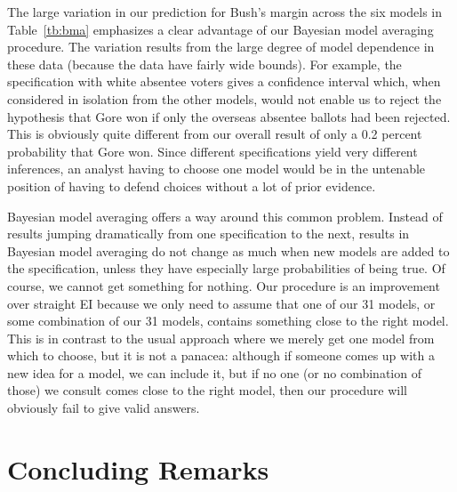 \documentclass[11pt,titlepage]{article}
\begin{document}
The large variation in our prediction for Bush's margin across the six
models in Table~\ref{tb:bma} emphasizes a clear advantage of our
Bayesian model averaging procedure.  The variation results from the
large degree of model dependence in these data (because the data have
fairly wide bounds).  For example, the specification with white
absentee voters gives a confidence interval which, when considered in
isolation from the other models, would not enable us to reject the
hypothesis that Gore won if only the overseas absentee ballots had
been rejected.  This is obviously quite different from our overall
result of only a 0.2 percent probability that Gore won.  Since
different specifications yield very different inferences, an analyst
having to choose one model would be in the untenable position of
having to defend choices without a lot of prior evidence.  

Bayesian model averaging offers a way around this common problem.
Instead of results jumping dramatically from one specification to the
next, results in Bayesian model averaging do not change as much when
new models are added to the specification, unless they have especially
large probabilities of being true.  Of course, we cannot get something
for nothing.  Our procedure is an improvement over straight EI because
we only need to assume that one of our 31 models, or some combination
of our 31 models, contains something close to the right model.  This
is in contrast to the usual approach where we merely get one model
from which to choose, but it is not a panacea: although if someone
comes up with a new idea for a model, we can include it, but if no one
(or no combination of those) we consult comes close to the right
model, then our procedure will obviously fail to give valid answers.


\section{Concluding Remarks}\label{s:concl}
\end{document}
